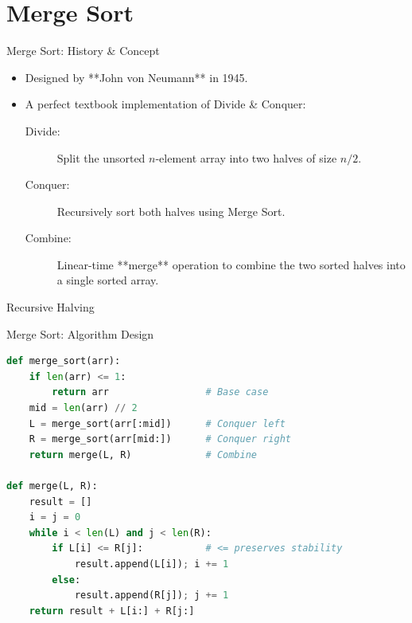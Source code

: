 \documentclass[aspectratio=169,xcolor=dvipsnames]{beamer}
\begin{document}
\section{Merge Sort}

\begin{frame}{Merge Sort: History \& Concept}
  \begin{itemize}
    \item Designed by **John von Neumann** in 1945.
    \item A perfect textbook implementation of Divide \& Conquer:
      \begin{description}
        \item[Divide:] Split the unsorted $n$-element array into two halves of size $n/2$.
        \item[Conquer:] Recursively sort both halves using Merge Sort.
        \item[Combine:] Linear-time **merge** operation to combine the two sorted halves into a single sorted array.
      \end{description}
  \end{itemize}
  \begin{block}{Recursive Halving}
    \begin{center}
    \end{center}
  \end{block}
\end{frame}

\begin{frame}[fragile]{Merge Sort: Algorithm Design}
  \begin{lstlisting}[language=Python]
def merge_sort(arr):
    if len(arr) <= 1:
        return arr                 # Base case
    mid = len(arr) // 2
    L = merge_sort(arr[:mid])      # Conquer left
    R = merge_sort(arr[mid:])      # Conquer right
    return merge(L, R)             # Combine

def merge(L, R):
    result = []
    i = j = 0
    while i < len(L) and j < len(R):
        if L[i] <= R[j]:           # <= preserves stability
            result.append(L[i]); i += 1
        else:
            result.append(R[j]); j += 1
    return result + L[i:] + R[j:]
  \end{lstlisting}
\end{frame}
\end{document}
